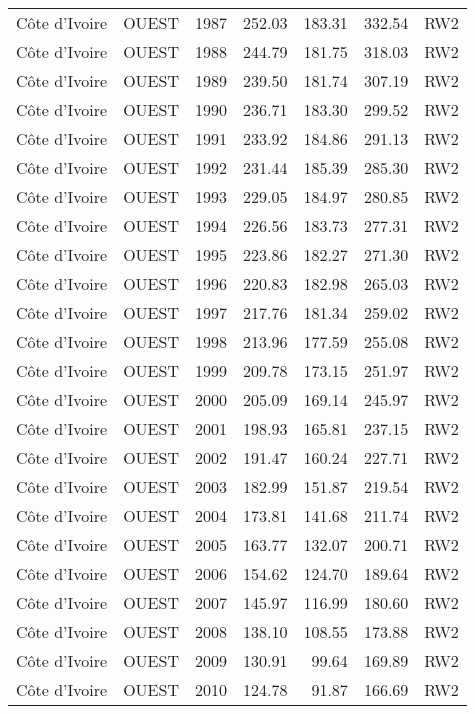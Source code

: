\begin{longtable}{lllrrrl}
  C\^{o}te d'Ivoire & OUEST & 1987 & 252.03 & 183.31 & 332.54 & RW2 \\ 
  C\^{o}te d'Ivoire & OUEST & 1988 & 244.79 & 181.75 & 318.03 & RW2 \\ 
  C\^{o}te d'Ivoire & OUEST & 1989 & 239.50 & 181.74 & 307.19 & RW2 \\ 
  C\^{o}te d'Ivoire & OUEST & 1990 & 236.71 & 183.30 & 299.52 & RW2 \\ 
  C\^{o}te d'Ivoire & OUEST & 1991 & 233.92 & 184.86 & 291.13 & RW2 \\ 
  C\^{o}te d'Ivoire & OUEST & 1992 & 231.44 & 185.39 & 285.30 & RW2 \\ 
  C\^{o}te d'Ivoire & OUEST & 1993 & 229.05 & 184.97 & 280.85 & RW2 \\ 
  C\^{o}te d'Ivoire & OUEST & 1994 & 226.56 & 183.73 & 277.31 & RW2 \\ 
  C\^{o}te d'Ivoire & OUEST & 1995 & 223.86 & 182.27 & 271.30 & RW2 \\ 
  C\^{o}te d'Ivoire & OUEST & 1996 & 220.83 & 182.98 & 265.03 & RW2 \\ 
  C\^{o}te d'Ivoire & OUEST & 1997 & 217.76 & 181.34 & 259.02 & RW2 \\ 
  C\^{o}te d'Ivoire & OUEST & 1998 & 213.96 & 177.59 & 255.08 & RW2 \\ 
  C\^{o}te d'Ivoire & OUEST & 1999 & 209.78 & 173.15 & 251.97 & RW2 \\ 
  C\^{o}te d'Ivoire & OUEST & 2000 & 205.09 & 169.14 & 245.97 & RW2 \\ 
  C\^{o}te d'Ivoire & OUEST & 2001 & 198.93 & 165.81 & 237.15 & RW2 \\ 
  C\^{o}te d'Ivoire & OUEST & 2002 & 191.47 & 160.24 & 227.71 & RW2 \\ 
  C\^{o}te d'Ivoire & OUEST & 2003 & 182.99 & 151.87 & 219.54 & RW2 \\ 
  C\^{o}te d'Ivoire & OUEST & 2004 & 173.81 & 141.68 & 211.74 & RW2 \\ 
  C\^{o}te d'Ivoire & OUEST & 2005 & 163.77 & 132.07 & 200.71 & RW2 \\ 
  C\^{o}te d'Ivoire & OUEST & 2006 & 154.62 & 124.70 & 189.64 & RW2 \\ 
  C\^{o}te d'Ivoire & OUEST & 2007 & 145.97 & 116.99 & 180.60 & RW2 \\ 
  C\^{o}te d'Ivoire & OUEST & 2008 & 138.10 & 108.55 & 173.88 & RW2 \\ 
  C\^{o}te d'Ivoire & OUEST & 2009 & 130.91 & 99.64 & 169.89 & RW2 \\ 
  C\^{o}te d'Ivoire & OUEST & 2010 & 124.78 & 91.87 & 166.69 & RW2 \\ 

\end{longtable}
